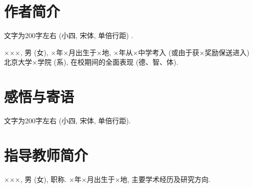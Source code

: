 \documentclass{urtemp}
\begin{document}
\section*{作者简介}

文字为200字左右 (小四, 宋体, 单倍行距) .

×××, 男 (女), ×年×月出生于×地, ×年从×中学考入 (或由于获×奖励保送进入) 北京大学×学院 (系), 在校期间的全面表现 (德、智、体).

\section*{感悟与寄语}

文字为200字左右 (小四, 宋体, 单倍行距).

\section*{指导教师简介}

×××, 男 (女), 职称. ×年×月出生于×地, 主要学术经历及研究方向.
\end{document}
